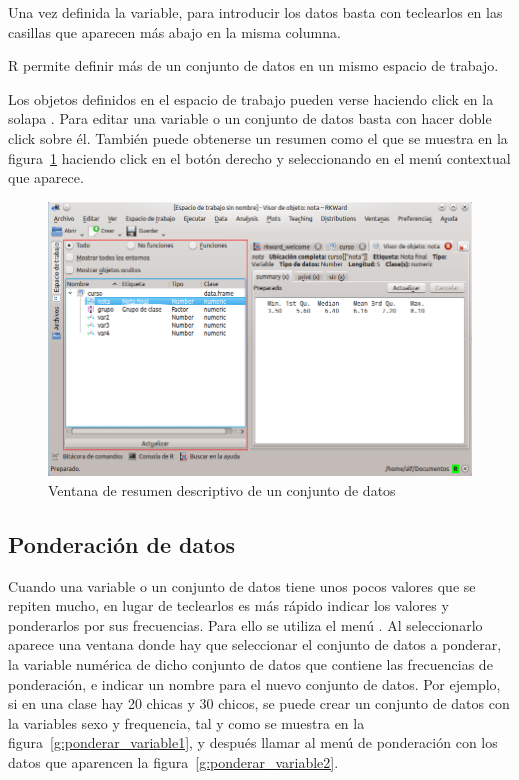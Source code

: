 Una vez definida la variable, para introducir los datos basta con teclearlos en las casillas que aparecen más abajo en
la misma columna.

R permite definir más de un conjunto de datos en un mismo espacio de trabajo.

Los objetos definidos en el espacio de trabajo pueden verse haciendo click en la solapa .
Para editar una variable o un conjunto de datos basta con hacer doble click sobre él.
También puede obtenerse un resumen como el que se muestra en la figura~\ref{g:resumen_datos} haciendo click en el botón
derecho y seleccionando  en el menú contextual que aparece.

\begin{figure}[htp]
\begin{center}
  \includegraphics[scale=0.6]{introduccion_r/img/resumen_datos}
  \caption{Ventana de resumen descriptivo de un conjunto de datos}
  \label{g:resumen_datos}
\end{center}
\end{figure}

\subsection{Ponderación de datos}
Cuando una variable o un conjunto de datos tiene unos pocos valores que se repiten mucho, en lugar de teclearlos es más
rápido indicar los valores y ponderarlos por sus frecuencias.
Para ello se utiliza el menú .
Al seleccionarlo aparece una ventana donde hay que seleccionar el conjunto de datos a ponderar, la variable numérica de
dicho conjunto de datos que contiene las frecuencias de ponderación, e indicar un nombre para el nuevo conjunto de datos.
Por ejemplo, si en una clase hay 20 chicas y 30 chicos, se puede crear un conjunto de datos con la variables sexo y
frequencia, tal y como se muestra en la figura~\ref{g:ponderar_variable1}, y después llamar al menú de ponderación con
los datos que aparencen la figura~\ref{g:ponderar_variable2}.

